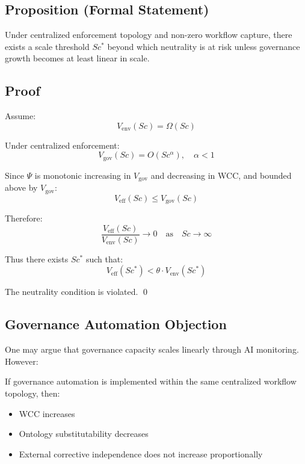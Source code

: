 \documentclass{article}
\begin{document}
\subsection{Proposition (Formal Statement)}

Under centralized enforcement topology and non-zero workflow capture, there exists a scale threshold $Sc^*$ beyond which neutrality is at risk unless governance growth becomes at least linear in scale.

\subsection{Proof}

Assume:
\begin{equation}
V_{\text{env}}(Sc) = \Omega(Sc)
\end{equation}

Under centralized enforcement:
\begin{equation}
V_{\text{gov}}(Sc) = O(Sc^{\alpha}), \quad \alpha < 1
\end{equation}

Since $\Psi$ is monotonic increasing in $V_{\text{gov}}$ and decreasing in WCC, and bounded above by $V_{\text{gov}}$:
\begin{equation}
V_{\text{eff}}(Sc) \leq V_{\text{gov}}(Sc)
\end{equation}

Therefore:
\begin{equation}
\frac{V_{\text{eff}}(Sc)}{V_{\text{env}}(Sc)} \to 0 \quad \text{as} \quad Sc \to \infty
\end{equation}

Thus there exists $Sc^*$ such that:
\begin{equation}
V_{\text{eff}}(Sc^*) < \theta \cdot V_{\text{env}}(Sc^*)
\end{equation}

The neutrality condition is violated. \qed

\subsection{Governance Automation Objection}

One may argue that governance capacity scales linearly through AI monitoring. However:

If governance automation is implemented within the same centralized workflow topology, then:
\begin{itemize}[noitemsep]
    \item WCC increases
    \item Ontology substitutability decreases
    \item External corrective independence does not increase proportionally
\end{itemize}
\end{document}
